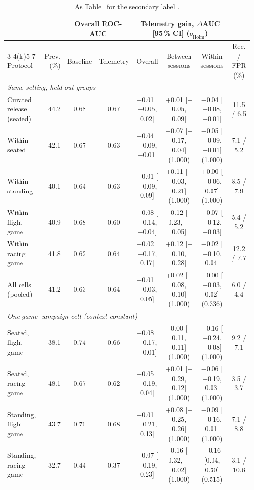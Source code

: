 \begin{table}[t]
\centering
\footnotesize
\caption{As Table~ for the secondary label \sevone{}.}
\label{tab:supp_gain_s1}
\setlength{\tabcolsep}{1.5pt}
\begin{tabular}{@{}lrcccccc@{}}
\toprule
 & & \multicolumn{2}{c}{Overall ROC-AUC} & \multicolumn{3}{c}{Telemetry gain, $\Delta$AUC [95\,\% CI] ($p_{\mathrm{Holm}}$)} & \\
\cmidrule(lr){3-4}\cmidrule(lr){5-7}
Protocol & Prev. (\%) & Baseline & Telemetry & Overall & Between sessions & Within sessions & Rec. / FPR (\%) \\
\midrule
\multicolumn{8}{l}{\emph{Same setting, held-out groups}} \\
Curated release (seated) & 44.2 & 0.68 & 0.67 & $-$0.01 [$-$0.05, 0.02] & +0.01 [$-$0.05, 0.09] & $-$0.04 [$-$0.08, $-$0.01] & 11.5 / 6.5 \\
Within seated & 42.1 & 0.67 & 0.63 & $-$0.04 [$-$0.09, $-$0.01] & $-$0.07 [$-$0.17, 0.04] (1.000) & $-$0.05 [$-$0.09, $-$0.01] (1.000) & 7.1 / 5.2 \\
Within standing & 40.1 & 0.64 & 0.63 & $-$0.01 [$-$0.09, 0.09] & +0.11 [$-$0.03, 0.21] (1.000) & +0.00 [$-$0.06, 0.07] (1.000) & 8.5 / 7.9 \\
Within flight game & 40.9 & 0.68 & 0.60 & $-$0.08 [$-$0.14, $-$0.04] & $-$0.12 [$-$0.23, $-$0.05] & $-$0.07 [$-$0.12, $-$0.03] & 5.4 / 5.2 \\
Within racing game & 41.8 & 0.62 & 0.64 & +0.02 [$-$0.17, 0.17] & +0.12 [$-$0.10, 0.28] & $-$0.02 [$-$0.10, 0.04] & 12.2 / 7.7 \\
All cells (pooled) & 41.2 & 0.63 & 0.64 & +0.01 [$-$0.03, 0.05] & +0.02 [$-$0.08, 0.10] (1.000) & $-$0.00 [$-$0.03, 0.02] (0.336) & 6.0 / 4.4 \\
\multicolumn{8}{l}{\emph{One game--campaign cell (context constant)}} \\
Seated, flight game & 38.1 & 0.74 & 0.66 & $-$0.08 [$-$0.17, $-$0.01] & $-$0.00 [$-$0.11, 0.11] (1.000) & $-$0.16 [$-$0.24, $-$0.08] (1.000) & 9.2 / 7.1 \\
Seated, racing game & 48.1 & 0.67 & 0.62 & $-$0.05 [$-$0.19, 0.04] & +0.01 [$-$0.29, 0.12] (1.000) & $-$0.06 [$-$0.19, 0.03] (1.000) & 3.5 / 3.7 \\
Standing, flight game & 43.7 & 0.70 & 0.68 & $-$0.01 [$-$0.21, 0.13] & +0.08 [$-$0.25, 0.26] (1.000) & $-$0.09 [$-$0.16, 0.01] (1.000) & 7.1 / 8.8 \\
Standing, racing game & 32.7 & 0.44 & 0.37 & $-$0.07 [$-$0.19, 0.23] & $-$0.16 [$-$0.32, $-$0.02] (1.000) & +0.16 [0.04, 0.30] (0.515) & 3.1 / 10.6 \\

\end{tabular}
\end{table}
